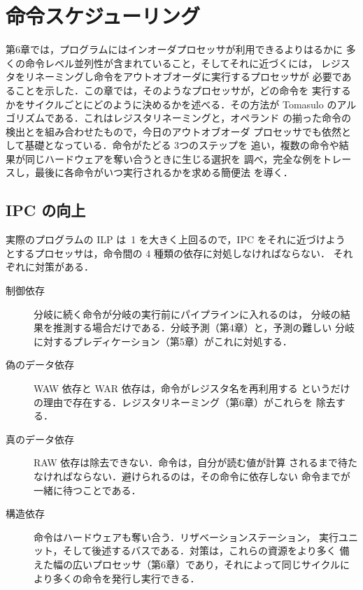 \documentclass[../main.tex]{subfiles}
\begin{document}
\chapter{命令スケジューリング}

第6章では，プログラムにはインオーダプロセッサが利用できるよりはるかに
多くの命令レベル並列性が含まれていること，そしてそれに近づくには，
レジスタをリネーミングし命令をアウトオブオーダに実行するプロセッサが
必要であることを示した．この章では，そのようなプロセッサが，どの命令を
実行するかをサイクルごとにどのように決めるかを述べる．その方法が
Tomasulo のアルゴリズムである．これはレジスタリネーミングと，オペランド
の揃った命令の検出とを組み合わせたもので，今日のアウトオブオーダ
プロセッサでも依然として基礎となっている．命令がたどる 3つのステップを
追い，複数の命令や結果が同じハードウェアを奪い合うときに生じる選択を
調べ，完全な例をトレースし，最後に各命令がいつ実行されるかを求める簡便法
を導く．

\section{IPC の向上}
\label{sec:l07-ipc}

実際のプログラムの ILP は~1 を大きく上回るので，IPC をそれに近づけよう
とするプロセッサは，命令間の 4 種類の依存に対処しなければならない．
それぞれに対策がある．
\begin{description}
  \item[制御依存] 分岐に続く命令が分岐の実行前にパイプラインに入れるのは，
    分岐の結果を推測する場合だけである．分岐予測（第4章）と，予測の難しい
    分岐に対するプレディケーション（第5章）がこれに対処する．
  \item[偽のデータ依存] WAW 依存と WAR 依存は，命令がレジスタ名を再利用する
    というだけの理由で存在する．レジスタリネーミング（第6章）がこれらを
    除去する．
  \item[真のデータ依存] RAW 依存は除去できない．命令は，自分が読む値が計算
    されるまで待たなければならない．避けられるのは，その命令に依存しない
    命令までが一緒に待つことである．
  \item[構造依存] 命令はハードウェアも奪い合う．リザベーションステーション，
    実行ユニット，そして後述するバスである．対策は，これらの資源をより多く
    備えた幅の広いプロセッサ（第6章）であり，それによって同じサイクルに
    より多くの命令を発行し実行できる．
\end{description}
\end{document}
